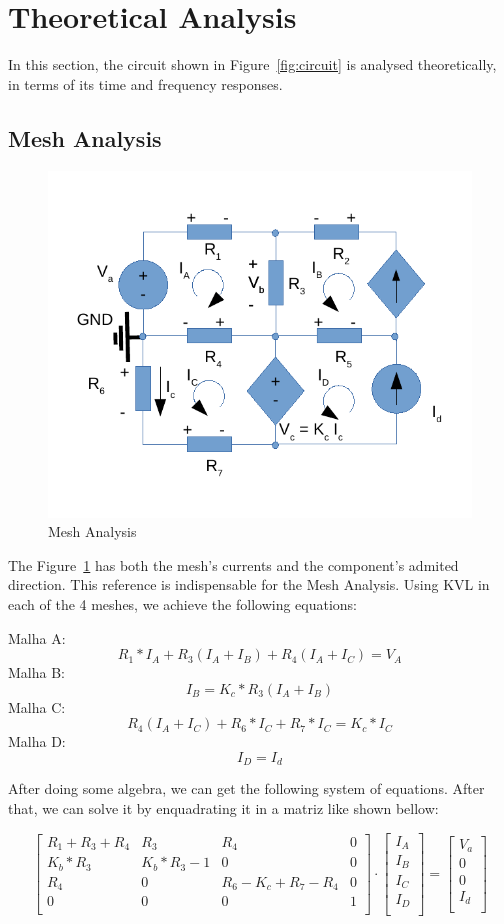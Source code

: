 \section{Theoretical Analysis}
\label{sec:analysis}

In this section, the circuit shown in Figure~\ref{fig:circuit} is analysed
theoretically, in terms of its time and frequency responses.

\subsection{Mesh Analysis}

\begin{figure}
\includegraphics[width=0.4\linewidth]{circ_mesh.pdf}
\caption{Mesh Analysis}
\label{fig:circuitMesh}
\end{figure}

The Figure~\ref{fig:circuitMesh} has both the mesh's currents and the 
component's admited direction.
This reference is indispensable for the Mesh Analysis.
Using KVL in each of the 4 meshes, we achieve the following equations:

Malha A:
$$ R_1 * I_A + R_3(I_A+I_B) + R_4(I_A+I_C) = V_A$$
Malha B:
$$ I_B = K_c * R_3(I_A + I_B) $$
Malha C:
$$ R_4(I_A + I_C) + R_6 * I_C + R_7 * I_C = K_c * I_C $$
Malha D:
$$ I_D = I_d $$

After doing some algebra, we can get the following system of equations. After that, 
we can solve it by enquadrating it in a matriz like shown bellow:

\[
\begin{bmatrix}
R_1 + R_3 + R_4 & R_3 & R_4 & 0\\
K_b * R_3 & K_b * R_3 - 1 & 0 & 0\\
R_4 & 0 & R_6 - K_c + R_7 - R_4 & 0\\
0 & 0 & 0 & 1\\
\end{bmatrix}
\cdot
\begin{bmatrix}
I_A\\
I_B\\
I_C\\
I_D\\
\end{bmatrix}
=
\begin{bmatrix}
V_a\\
0\\
0\\
I_d\\
\end{bmatrix}
\]


